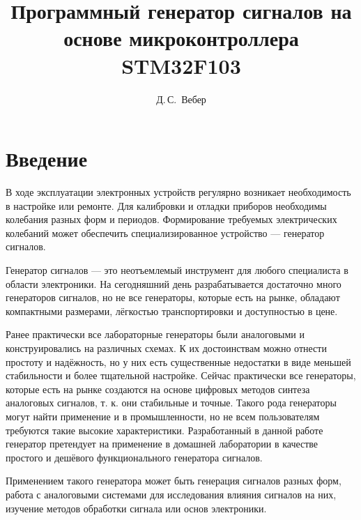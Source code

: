 \documentclass[14pt, oneside]{altsu-bachelor}
\title{Программный генератор сигналов на основе микроконтроллера STM32F103}
\author{Д.\,С.~Вебер}
\institute{Институт цифровых технологий, электроники и физики}
\date{\the\year}
\begin{document}
\maketitle

\setcounter{page}{2}
\makeabstract
\tableofcontents

\chapter*{Введение}
	В ходе эксплуатации электронных устройств регулярно возникает необходимость в настройке или ремонте. Для калибровки и отладки приборов необходимы колебания разных форм и периодов. Формирование требуемых электрических колебаний может обеспечить специализированное устройство --- генератор сигналов.
	
	Генератор сигналов --- это неотъемлемый инструмент для любого специалиста в области электроники. %
	На сегодняшний день разрабатывается достаточно много генераторов сигналов, %
	 но не все генераторы, которые есть на рынке, обладают компактными размерами, лёгкостью транспортировки и доступностью в цене. %
	
	Ранее практически все лабораторные генераторы были аналоговыми и конструировались на различных схемах. К их достоинствам можно отнести простоту и надёжность, но у них есть существенные недостатки в виде меньшей стабильности и более тщательной настройке. Сейчас практически все генераторы, которые есть на рынке создаются на основе цифровых методов синтеза аналоговых сигналов, %
	 т. к. они стабильные и точные. %
	 Такого рода генераторы могут найти применение и в промышленности, но не всем пользователям требуются такие высокие характеристики. Разработанный в данной работе генератор претендует на применение в домашней лаборатории в качестве простого и дешёвого функционального генератора сигналов.
	
	Применением такого генератора может быть генерация сигналов разных форм, работа с аналоговыми системами для исследования влияния сигналов на них, изучение методов обработки сигнала или основ электроники. 
	
\end{document}
